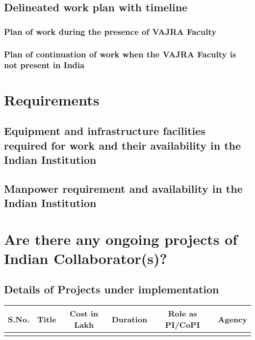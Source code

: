 \documentclass[twoside]{article}
\begin{document}
\subsection{Delineated work plan with timeline}

\subsubsection{Plan of work during the presence of VAJRA Faculty}

\subsubsection{Plan of continuation of work when the VAJRA Faculty is not present in India }

\section{Requirements}

\subsection{Equipment and infrastructure facilities required for work and their availability in the Indian Institution}

\subsection{Manpower requirement and availability in the Indian Institution}

\section{Are there any ongoing projects of Indian Collaborator(s)?}

\subsection{Details of Projects under implementation}

\begin{center}
\begin{tabular}{ |c|c|c|c|c|c| } 
 \hline
 S.No. & Title & Cost in Lakh & Duration & Role as PI/CoPI & Agency\\ 
 \hline
  &  & & & &\\ 
 \hline
\end{tabular}
\end{center}
\end{document}
